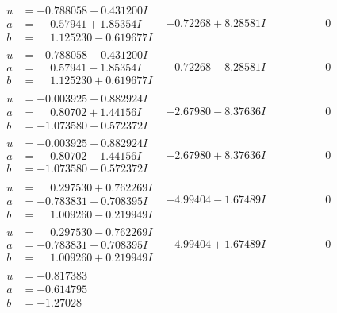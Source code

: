 \documentclass[1p]{elsarticle_modified}
\theoremstyle{definition}
\begin{document}
$$\begin{array}{c|c|c}
\begin{aligned}
u &= -0.788058 + 0.431200 I \\
a &= \phantom{-}0.57941 + 1.85354 I \\
b &= \phantom{-}1.125230 - 0.619677 I\end{aligned}
 & -0.72268 + 8.28581 I & \phantom{-0.000000 } 0 \\ \hline\begin{aligned}
u &= -0.788058 - 0.431200 I \\
a &= \phantom{-}0.57941 - 1.85354 I \\
b &= \phantom{-}1.125230 + 0.619677 I\end{aligned}
 & -0.72268 - 8.28581 I & \phantom{-0.000000 } 0 \\ \hline\begin{aligned}
u &= -0.003925 + 0.882924 I \\
a &= \phantom{-}0.80702 + 1.44156 I \\
b &= -1.073580 - 0.572372 I\end{aligned}
 & -2.67980 - 8.37636 I & \phantom{-0.000000 } 0 \\ \hline\begin{aligned}
u &= -0.003925 - 0.882924 I \\
a &= \phantom{-}0.80702 - 1.44156 I \\
b &= -1.073580 + 0.572372 I\end{aligned}
 & -2.67980 + 8.37636 I & \phantom{-0.000000 } 0 \\ \hline\begin{aligned}
u &= \phantom{-}0.297530 + 0.762269 I \\
a &= -0.783831 + 0.708395 I \\
b &= \phantom{-}1.009260 - 0.219949 I\end{aligned}
 & -4.99404 - 1.67489 I & \phantom{-0.000000 } 0 \\ \hline\begin{aligned}
u &= \phantom{-}0.297530 - 0.762269 I \\
a &= -0.783831 - 0.708395 I \\
b &= \phantom{-}1.009260 + 0.219949 I\end{aligned}
 & -4.99404 + 1.67489 I & \phantom{-0.000000 } 0 \\ \hline\begin{aligned}
u &= -0.817383\phantom{ +0.000000I} \\
a &= -0.614795\phantom{ +0.000000I} \\
b &= -1.27028\phantom{ +0.000000I}\end{aligned}

\end{array}$$
\end{document}
